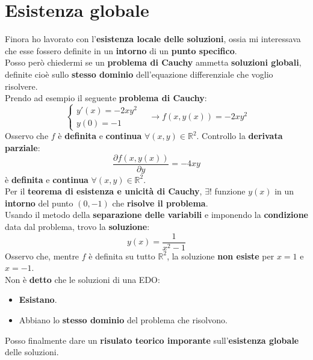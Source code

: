 \documentclass[a4paper, oneside]{article}
\newcommand\R{\mathbb{R}}
\newcommand\de{\partial}
\begin{document}
    \newpage

    \section{Esistenza globale}
    Finora ho lavorato con l'\textbf{esistenza locale delle soluzioni}, ossia mi interessava che esse fossero definite
    in un \textbf{intorno} di un \textbf{punto specifico}.\\
    Posso però chiedermi se un \textbf{problema di Cauchy} ammetta \textbf{soluzioni globali}, definite cioè sullo
    \textbf{stesso dominio} dell'equazione differenziale che voglio risolvere. \\
    Prendo ad esempio il seguente \textbf{problema di Cauchy}:
    \[\begin{cases}
        y'(x) = -2xy^2 \\
        y(0) = -1
    \end{cases} \quad \longrightarrow f\left(x,y(x)\right) = -2xy^2\]
    Osservo che $f$ è \textbf{definita} e \textbf{continua} $\forall(x,y)\in\R^2$. Controllo la \textbf{derivata parziale}:
    \[\frac{\de f\left(x,y(x)\right)}{\de y} = -4xy\]
    è \textbf{definita} e \textbf{continua} $\forall(x,y)\in\R^2$. \\
    Per il \textbf{teorema di esistenza e unicità di Cauchy}, $\exists!$ funzione $y(x)$ in un \textbf{intorno} del punto
    $(0,-1)$ che \textbf{risolve il problema}. \\
    Usando il metodo della \textbf{separazione delle variabili} e imponendo la \textbf{condizione} data dal problema,
    trovo la \textbf{soluzione}:
    \[y(x) = \frac{1}{x^2-1}\]
    Osservo che, mentre $f$ è definita su tutto $\R^2$, la soluzione \textbf{non esiste} per $x=1$ e $x=-1$. \\
    Non è \textbf{detto} che le soluzioni di una EDO:
    \begin{itemize}
        \item \textbf{Esistano}.
        \item Abbiano lo \textbf{stesso dominio} del problema che risolvono.\\
    \end{itemize}
    Posso finalmente dare un \textbf{risulato teorico imporante} sull'\textbf{esistenza globale} delle soluzioni. \\
\end{document}
